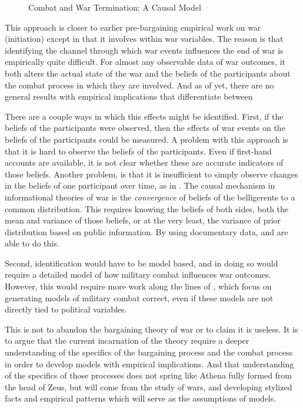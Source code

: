 \begin{figure}[!htpb]
  \centering
  
  \caption{Combat and War Termination: A Causal Model}
  \label{bonds:fig:combat-causal-diagram}
\end{figure}

This approach is closer to earlier pre-bargaining empirical work on war (initiation) except in that it involves within war variables. %
The reason is that identifying the channel through which war events influences the end of war is empirically quite difficult. %
For almost any observable data of war outcomes, it both alters the actual state of the war and the beliefs of the participants about the combat process in which they are involved. %
And as of yet, there are no general results with empirical implications that differentiate between

There are a couple ways in which this effects might be identified. %
First, if the beliefs of the participants were observed, then the effects of war events on the beliefs of the participants could be measured. %
A problem with this approach is that it is hard to observe the beliefs of the participants.
Even if first-hand accounts are available, it is not clear whether these are accurate indicators of those beliefs. %
Another problem, is that it is insufficient to simply observe changes in the beliefs of one participant over time, as in \textcite{Reiter2009}. %
The causal mechanism in informational theories of war is the \textit{convergence} of beliefs of the belligerents to a common distribution. %
This requires knowing the beliefs of both sides, both the mean and variance of those beliefs, or at the very least, the variance of prior distribution based on public information. %
By using documentary data, \textcite{Goemans2000} and \textcite{Reiter2009} are able to do this.

Second, identification would have to be model based, and in doing so would require a detailed model of how military combat influences war outcomes.
However, this would require more work along the lines of \textcite{Biddle2004}, which focus on generating models of military combat correct, even if these models are not directly tied to political variables.

This is not to abandon the bargaining theory of war or to claim it is useless.
It is to argue that the current incarnation of the theory require a deeper understanding of the specifics of the bargaining process and the combat process in order to develop models with empirical implications.
And that understanding of the specifics of those processes does not spring like Athena fully formed from the head of Zeus, but will come from the study of wars, and developing stylized facts and empirical patterns which will serve as the assumptions of models.

